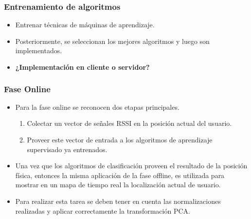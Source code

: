 \documentclass[mathserif]{beamer}
\begin{document}

\begin{frame}
\frametitle{Entrenamiento de algoritmos}

\begin{itemize}

\item Entrenar técnicas de máquinas de aprendizaje.

\pause
\item Posteriormente, se seleccionan los mejores algoritmos y luego son implementados.
\pause

\item \textbf{¿Implementación en cliente o servidor?}

\end{itemize}

\end{frame}


\begin{frame}
\frametitle{Fase Online}

\begin{itemize}

\item Para la fase online se reconocen dos etapas principales.

\begin{enumerate}
\pause
\item Colectar un vector de señales RSSI en la posición actual del usuario.
\pause
\item Proveer este vector de entrada a los algoritmos de aprendizaje supervisado ya entrenados.
\end{enumerate}

\pause
\item Una vez que los algoritmos de clasificación proveen el resultado de la posición física, entonces la misma aplicación de la fase offline, es utilizada para mostrar en un mapa de tiempo real la localización actual de usuario.

\pause

\item Para realizar esta tarea se deben tener en cuenta las normalizaciones realizadas y aplicar correctamente la transformación PCA.


\end{itemize}
\end{frame}


\end{document}
